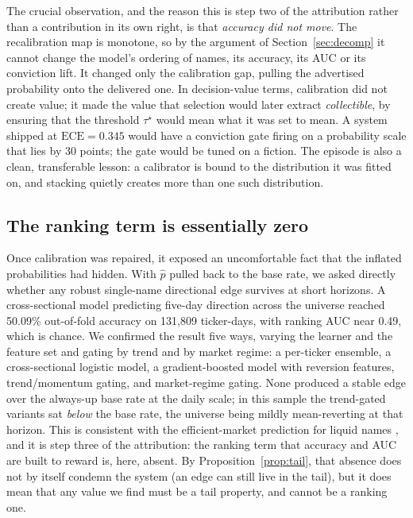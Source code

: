 \documentclass{sbc2023}%
\theoremstyle{definition}
\theoremstyle{plain}
\newcommand{\ece}{\mathrm{ECE}}
\newcommand{\Pup}{\hat p}
\begin{document}
The crucial observation, and the reason this is step two of the attribution rather than
a contribution in its own right, is that \emph{accuracy did not move}. The
recalibration map is monotone, so by the argument of Section~\ref{sec:decomp} it cannot
change the model's ordering of names, its accuracy, its AUC or its conviction lift. It
changed only the calibration gap, pulling the advertised probability onto the delivered
one. In decision-value terms, calibration did not create value; it made the value that
selection would later extract \emph{collectible}, by ensuring that the threshold
$\tau^\star$ would mean what it was set to mean. A system shipped at $\ece=0.345$ would
have a conviction gate firing on a probability scale that lies by 30 points; the gate
would be tuned on a fiction. The episode is also a clean, transferable lesson: a
calibrator is bound to the distribution it was fitted on, and stacking quietly creates
more than one such distribution.

\subsection{The ranking term is essentially zero}
\label{sec:ceiling}
Once calibration was repaired, it exposed an uncomfortable fact that the inflated
probabilities had hidden. With $\Pup$ pulled back to the base rate, we asked directly whether any robust
single-name directional edge survives at short horizons. A cross-sectional model
predicting five-day direction across the universe reached 50.09\% out-of-fold accuracy
on 131{,}809 ticker-days, with ranking AUC near 0.49, which is chance. We confirmed the result
five ways, varying the learner and the feature set and gating by trend and by market
regime: a per-ticker ensemble, a cross-sectional logistic model, a gradient-boosted
model with reversion features, trend/momentum gating, and market-regime gating. None
produced a stable edge over the always-up base rate at the daily scale; in this
sample the trend-gated variants sat \emph{below} the base rate, the universe being
mildly mean-reverting at that horizon. This is consistent with the efficient-market
prediction for liquid names \citep{fama1970,malkiel2003}, and it is step three of the
attribution: the ranking term that accuracy and AUC are built to reward is, here,
absent. By Proposition~\ref{prop:tail}, that absence does not by itself condemn the
system (an edge can still live in the tail), but it does mean that any value we find
must be a tail property, and cannot be a ranking one.
\end{document}
